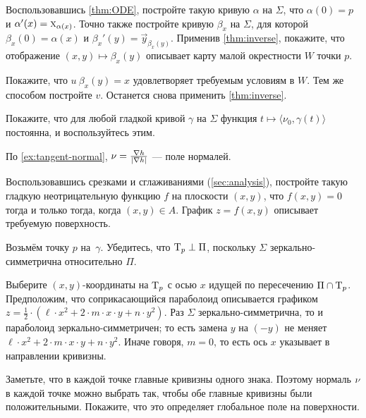 \begin{multicols}{2}
Воспользовавшись \ref{thm:ODE}, постройте такую кривую $\alpha$ на $\Sigma$, что $\alpha(0)=p$ и $\alpha'(x)\z=\vec x_{\alpha(x)}$.
Точно также постройте кривую $\beta_x$ на $\Sigma$, для которой $\beta_x(0)=\alpha(x)$ и $\beta_x'(y)=\vec y_{\beta_x(y)}$.
Применив \ref{thm:inverse}, покажите, что отображение $(x,y)\mapsto \beta_x(y)$ описывает карту малой окрестности $W$ точки $p$.

Покажите, что $u\:\beta_x(y)= x$ удовлетворяет требуемым условиям в $W$.
Тем же способом постройте $v$.
Останется снова применить \ref{thm:inverse}.

Покажите, что для любой гладкой кривой $\gamma$ на $\Sigma$ функция $t\mapsto \langle\nu_0,\gamma(t)\rangle$ постоянна, и воспользуйтесь этим.

По \ref{ex:tangent-normal}, $\nu=\tfrac{\nabla h}{|\nabla h|}$ --- поле нормалей.

Воспользовавшись срезками и сглаживаниями (\ref{sec:analysis}), постройте такую гладкую неотрицательную функцию $f$ на плоскости $(x,y)$, что $f(x,y)=0$ тогда и только тогда, когда $(x,y)\in A$.
График $z=f(x,y)$ описывает требуемую поверхность.


\setcounter{eqtn}{0}

Возьмём точку $p$ на~$\gamma$.
Убедитесь, что $\mathrm{T}_p\perp \Pi$, поскольку $\Sigma$ зеркально-симметрична относительно $\Pi$.

Выберите $(x,y)$-координаты на $\mathrm{T}_p$ с осью $x$ идущей по пересечению $\Pi\cap \mathrm{T}_p$.
Предположим, что соприкасающийся параболоид описывается графиком 
$z=\tfrac12\cdot(\ell\cdot x^2+2\cdot m\cdot x\cdot y+n\cdot y^2)$.
Раз $\Sigma$ зеркально-симметрична, то и параболоид зеркально-симметричен;
то есть замена $y$ на $(-y)$ не меняет 
$\ell\cdot x^2+2\cdot m\cdot x\cdot y+n\cdot y^2$.
Иначе говоря, $m=0$, то есть ось $x$ указывает в направлении кривизны.

Заметьте, что в каждой точке главные кривизны одного знака.
Поэтому нормаль $\nu$ в каждой точке можно выбрать так, чтобы обе главные кривизны были положительными.
Покажите, что это определяет глобальное поле на поверхности.


\end{multicols}
